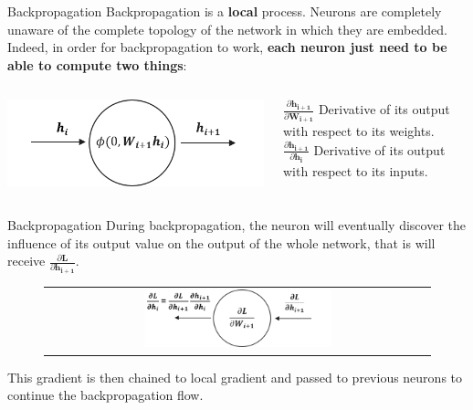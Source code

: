\documentclass[aspectratio=169]{beamer}
\begin{document}
\begin{frame}{Backpropagation}
Backpropagation is a \textbf{local} process. Neurons are completely unaware of the complete topology of the network in which they are embedded.\\
\vspace{0.5cm}
Indeed, in order for backpropagation to work, \textbf{each neuron just need to be able to compute two things}:\\
\vspace{0.5cm}
\begin{columns}
\begin{column}{0.3\textwidth}
	\includegraphics[width=\textwidth]{img/dnn/single_neuron_forward.png}
\end{column}
\begin{column}{0.7\textwidth}
	$\frac{\partial \bm{h_{i+1}}}{\partial \bm{W_{i+1}}}$ Derivative of its output with respect to its weights.\\
	\vspace{0.2cm}
	$\frac{\partial \bm{h_{i+1}}}{\partial \bm{h_{i}}}$ Derivative of its output with respect to its inputs.
\end{column}
\end{columns}
\vspace{0.5cm}
\end{frame}



\begin{frame}{Backpropagation}
During backpropagation, the neuron will eventually discover the influence of its output value on the output of the whole network, that is will receive $\frac{\partial \bm{L}}{\partial \bm{h_{i+1}}}$.\\
\vspace{0.5cm}
\begin{figure}
\begin{tabular}{c}
\includegraphics[width=0.5\textwidth]{img/dnn/single_neuron_backward.png}
\end{tabular}
\end{figure}
This gradient is then chained to local gradient and passed to previous neurons to continue the backpropagation flow.
\end{frame}
\end{document}
